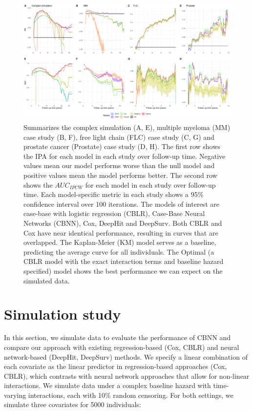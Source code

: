 \documentclass[APA,LATO1COL]{WileyNJD-v2}
\begin{document}
\begin{figure}

{\centering \includegraphics[width=1\linewidth]{../figures/megaPlot} 

}

\caption{Summarizes the complex simulation (A, E), multiple myeloma (MM) case study (B, F), free light chain (FLC) case study (C, G) and prostate cancer (Prostate) case study (D, H). The first row shows the IPA for each model in each study over follow-up time. Negative values mean our model performs worse than the null model and positive values mean the model performs better. The second row shows the $AUC_{IPCW}$ for each model in each study over follow-up time. Each model-specific metric in each study shows a 95\% confidence interval over 100 iterations. The models of interest are case-base with logistic regression (CBLR), Case-Base Neural Networks (CBNN), Cox, DeepHit and DeepSurv. Both CBLR and Cox have near identical performance, resulting in curves that are overlapped. The Kaplan-Meier (KM) model serves as a baseline, predicting the average curve for all individuals. The Optimal (a CBLR model with the exact interaction terms and baseline hazard specified) model shows the best performance we can expect on the simulated data. }\label{fig:megaPlot}
\end{figure}



\hypertarget{sims}{%
\section{Simulation study}\label{sims}}

In this section, we simulate data to evaluate the performance of
CBNN and compare our approach with existing regression-based (Cox, CBLR)
and neural network-based (DeepHit, DeepSurv) methods. We specify a
linear combination of each covariate as the linear predictor in
regression-based approaches (Cox, CBLR), which contrasts with neural
network approaches that allow for non-linear interactions. We simulate
data under a complex baseline hazard with
time-varying interactions, each with 10\% random censoring. For both
settings, we simulate three covariates for 5000 individuals:
\end{document}
